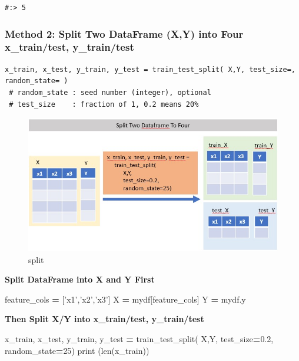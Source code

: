 \documentclass[
]{book}
\newenvironment{Shaded}{\begin{snugshade}}{\end{snugshade}}
\newcommand{\BuiltInTok}[1]{#1}
\newcommand{\DecValTok}[1]{\textcolor[rgb]{0.06,0.06,0.06}{#1}}
\newcommand{\FloatTok}[1]{\textcolor[rgb]{0.06,0.06,0.06}{#1}}
\newcommand{\NormalTok}[1]{#1}
\newcommand{\OperatorTok}[1]{\textcolor[rgb]{0.43,0.43,0.43}{\textbf{#1}}}
\newcommand{\StringTok}[1]{\textcolor[rgb]{0.5,0.5,0.5}{#1}}
\begin{document}
\begin{verbatim}
#:> 5
\end{verbatim}

\hypertarget{method-2-split-two-dataframe-xy-into-four-x_traintest-y_traintest}{%
\subsubsection{Method 2: Split Two DataFrame (X,Y) into Four x\_train/test, y\_train/test}\label{method-2-split-two-dataframe-xy-into-four-x_traintest-y_traintest}}

\begin{verbatim}
x_train, x_test, y_train, y_test = train_test_split( X,Y, test_size=, random_state= )
 # random_state : seed number (integer), optional
 # test_size    : fraction of 1, 0.2 means 20%
\end{verbatim}

\begin{figure}
\centering
\includegraphics{img/train_test_split_2.jpg}
\caption{split}
\end{figure}

\textbf{Split DataFrame into X and Y First}

\begin{Shaded}
\begin{Highlighting}[]
\NormalTok{feature_cols }\OperatorTok{=}\NormalTok{ [}\StringTok{'x1'}\NormalTok{,}\StringTok{'x2'}\NormalTok{,}\StringTok{'x3'}\NormalTok{]}
\NormalTok{X }\OperatorTok{=}\NormalTok{ mydf[feature_cols]}
\NormalTok{Y }\OperatorTok{=}\NormalTok{ mydf.y}
\end{Highlighting}
\end{Shaded}

\textbf{Then Split X/Y into x\_train/test, y\_train/test}

\begin{Shaded}
\begin{Highlighting}[]
\NormalTok{x_train, x_test, y_train, y_test }\OperatorTok{=}\NormalTok{ train_test_split( X,Y, test_size}\OperatorTok{=}\FloatTok{0.2}\NormalTok{, random_state}\OperatorTok{=}\DecValTok{25}\NormalTok{)}
\BuiltInTok{print}\NormalTok{ (}\BuiltInTok{len}\NormalTok{(x_train))}
\end{Highlighting}
\end{Shaded}
\end{document}
